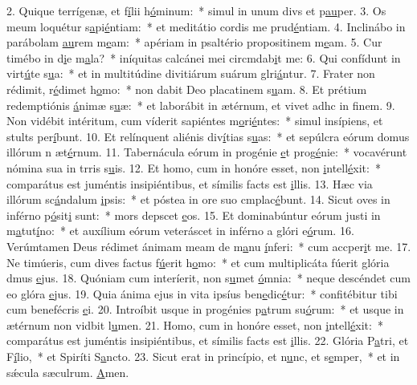 2. Quique terrígenæ, et f\uline{í}lii h\uline{ó}minum:~* simul in unum divs et p\uline{au}per.
3. Os meum loquétur s\uline{a}pi\uline{é}ntiam:~* et meditátio cordis me prud\uline{é}ntiam.
4. Inclinábo in parábolam \uline{au}rem m\uline{e}am:~* apériam in psaltério propositinem m\uline{e}am.
5. Cur timébo in d\uline{i}e m\uline{a}la?~* iníquitas calcánei mei circmdab\uline{i}t me:
6. Qui confídunt in virt\uline{ú}te s\uline{u}a:~* et in multitúdine divitiárum suárum glri\uline{á}ntur.
7. Frater non rédimit, r\uline{é}dimet h\uline{o}mo:~* non dabit Deo placatinem s\uline{u}am.
8. Et prétium redemptiónis \uline{á}nimæ s\uline{u}æ:~* et laborábit in ætérnum, et vivet adhc in f\uline{i}nem.
9. Non vidébit intéritum, cum víderit sapiéntes m\uline{o}ri\uline{é}ntes:~* simul insípiens, et stults per\uline{í}bunt.
10. Et relínquent aliénis div\uline{í}tias s\uline{u}as:~* et sepúlcra eórum domus illórum n æt\uline{é}rnum.
11. Tabernácula eórum in progénie \uline{e}t prog\uline{é}nie:~* vocavérunt nómina sua in trris s\uline{u}is.
12. Et homo, cum in honóre esset, non \uline{i}ntell\uline{é}xit:~* comparátus est juméntis insipiéntibus, et símilis facts est \uline{i}llis.
13. Hæc via illórum sc\uline{á}ndalum \uline{i}psis:~* et póstea in ore suo cmplac\uline{é}bunt.
14. Sicut oves in inférno p\uline{ó}sit\uline{i} sunt:~* mors depscet \uline{e}os.
15. Et dominabúntur eórum justi in m\uline{a}tut\uline{í}no:~* et auxílium eórum veteráscet in inférno a glóri e\uline{ó}rum.
16. Verúmtamen Deus rédimet ánimam meam de m\uline{a}nu \uline{í}nferi:~* cum accper\uline{i}t me.
17. Ne timúeris, cum dives factus f\uline{ú}erit h\uline{o}mo:~* et cum multiplicáta fúerit glória dmus \uline{e}jus.
18. Quóniam cum interíerit, non s\uline{u}met \uline{ó}mnia:~* neque descéndet cum eo glóra \uline{e}jus.
19. Quia ánima ejus in vita ipsíus ben\uline{e}dic\uline{é}tur:~* confitébitur tibi cum benefécris \uline{e}i.
20. Introíbit usque in progénies p\uline{a}trum su\uline{ó}rum:~* et usque in ætérnum non vidbit l\uline{u}men.
21. Homo, cum in honóre esset, non \uline{i}ntell\uline{é}xit:~* comparátus est juméntis insipiéntibus, et símilis facts est \uline{i}llis.
22. Glória P\uline{a}tri, et F\uline{í}lio,~* et Spiríti S\uline{a}ncto.
23. Sicut erat in princípio, et n\uline{u}nc, et s\uline{e}mper,~* et in sǽcula sæculrum. \uline{A}men.
